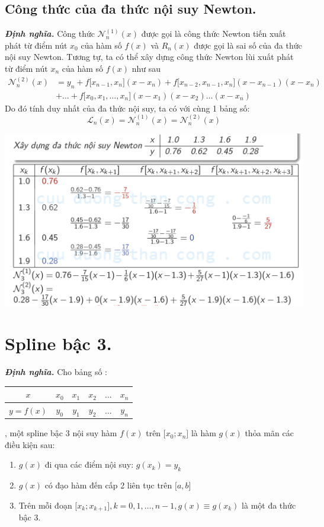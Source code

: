 \documentclass[12pt, a4paper]{report}
\def\DN{\textbf{\textit{Định nghĩa. }}}
\begin{document}
\subsection{Công thức của đa thức nội suy Newton.}
\DN Công thức $\mathcal{N}^{(1)}_n (x)$ được gọi là công thức Newton tiến xuất phát từ điểm nút $x_0$ của hàm số $f(x)$ và $R_n (x)$ được gọi là sai số của đa thức nội suy Newton. Tương tự, ta có thể xây dựng công thức Newton lùi xuất phát từ điểm nút $x_n$ của hàm số $f(x)$ như sau
\[  
    \begin{aligned}
        \mathcal{N}^{(2)}_n (x) &= y_n + f \lbrack x_{n-1},x_n \rbrack (x-x_n) + f\lbrack x_{n-2},x_{n-1},x_n \rbrack(x-x_{n-1})(x-x_n) \\
                                &+ \ldots + f \lbrack x_0,x_1,\ldots,x_n \rbrack (x-x_1)(x-x_2)\ldots(x-x_n)
    \end{aligned}
\]
Do đó tính duy nhất của đa thức nội suy, ta có với cùng 1 bảng số:
\[
    \mathcal{L}_n (x) = \mathcal{N}^{(1)}_n (x) = \mathcal{N}^{(2)}_n (x)    
\]
\begin{center}
    \includegraphics[scale = 0.5]{6.png}
\end{center}
\section{Spline bậc 3.}
\DN Cho bảng số : \begin{tabular}{c|ccccc}
    $x$ & $x_0$ & $x_1$ & $x_2$ & $\ldots$ & $x_n$ \\ \hline
    $y = f(x)$ & $y_0$ & $y_1$ & $y_2$ & $\ldots$ & $y_n$ 
    \end{tabular}, một spline bậc 3 nội suy hàm $f(x)$ trên $\lbrack x_0;x_n \rbrack$ là hàm $g(x)$ thỏa mãn các điều kiện sau:
\begin{enumerate}
    \item $g(x)$ đi qua các điểm nội suy: $g(x_k) = y_k$
    \item $g(x)$ có đạo hàm đến cấp 2 liên tục trên $\lbrack a,b \rbrack$
    \item Trên mỗi đoạn $\lbrack x_k;x_{k+1} \rbrack, k=0,1,\ldots,n-1, g(x) \equiv g(x_k)$ là một đa thức bậc 3.
\end{enumerate}
\end{document}
